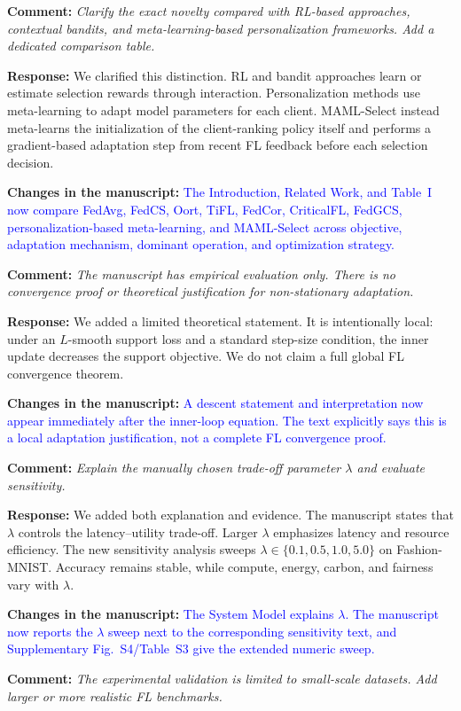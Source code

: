 \documentclass[11pt]{article}
\newcommand{\comment}[1]{\textbf{Comment:} \textit{#1}}
\newcommand{\response}[1]{\textbf{Response:} #1}
\newcommand{\change}[1]{\textbf{Changes in the manuscript:} \textcolor{blue}{#1}}
\begin{document}
\comment{Clarify the exact novelty compared with RL-based approaches, contextual bandits, and meta-learning-based personalization frameworks. Add a dedicated comparison table.}

\response{We clarified this distinction. RL and bandit approaches learn or estimate selection rewards through interaction. Personalization methods use meta-learning to adapt model parameters for each client. MAML-Select instead meta-learns the initialization of the client-ranking policy itself and performs a gradient-based adaptation step from recent FL feedback before each selection decision.}

\change{The Introduction, Related Work, and Table~I now compare FedAvg, FedCS, Oort, TiFL, FedCor, CriticalFL, FedGCS, personalization-based meta-learning, and MAML-Select across objective, adaptation mechanism, dominant operation, and optimization strategy.}

\comment{The manuscript has empirical evaluation only. There is no convergence proof or theoretical justification for non-stationary adaptation.}

\response{We added a limited theoretical statement. It is intentionally local: under an $L$-smooth support loss and a standard step-size condition, the inner update decreases the support objective. We do not claim a full global FL convergence theorem.}

\change{A descent statement and interpretation now appear immediately after the inner-loop equation. The text explicitly says this is a local adaptation justification, not a complete FL convergence proof.}

\comment{Explain the manually chosen trade-off parameter $\lambda$ and evaluate sensitivity.}

\response{We added both explanation and evidence. The manuscript states that $\lambda$ controls the latency--utility trade-off. Larger $\lambda$ emphasizes latency and resource efficiency. The new sensitivity analysis sweeps $\lambda\in\{0.1,0.5,1.0,5.0\}$ on Fashion-MNIST. Accuracy remains stable, while compute, energy, carbon, and fairness vary with $\lambda$.}

\change{The System Model explains $\lambda$. The manuscript now reports the $\lambda$ sweep next to the corresponding sensitivity text, and Supplementary Fig.~S4/Table~S3 give the extended numeric sweep.}

\comment{The experimental validation is limited to small-scale datasets. Add larger or more realistic FL benchmarks.}
\end{document}
